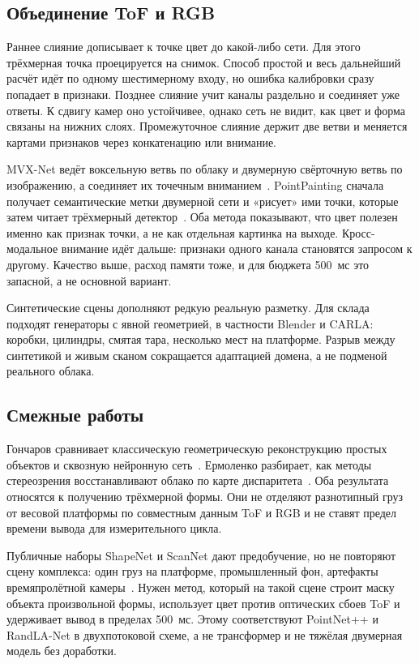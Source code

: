 \documentclass{misisarticle}
\begin{document}
\subsection{Объединение ToF и RGB}

Раннее слияние дописывает к точке цвет до какой-либо сети. Для этого трёхмерная точка проецируется на снимок. Способ простой и весь дальнейший расчёт идёт по одному шестимерному входу, но ошибка калибровки сразу попадает в признаки. Позднее слияние учит каналы раздельно и соединяет уже ответы. К сдвигу камер оно устойчивее, однако сеть не видит, как цвет и форма связаны на нижних слоях. Промежуточное слияние держит две ветви и меняется картами признаков через конкатенацию или внимание.

MVX-Net ведёт воксельную ветвь по облаку и двумерную свёрточную ветвь по изображению, а соединяет их точечным вниманием~\cite{mvxnet}. PointPainting сначала получает семантические метки двумерной сети и «рисует» ими точки, которые затем читает трёхмерный детектор~\cite{pointpainting}. Оба метода показывают, что цвет полезен именно как признак точки, а не как отдельная картинка на выходе. Кросс-модальное внимание идёт дальше: признаки одного канала становятся запросом к другому. Качество выше, расход памяти тоже, и для бюджета 500~мс это запасной, а не основной вариант.

Синтетические сцены дополняют редкую реальную разметку. Для склада подходят генераторы с явной геометрией, в частности Blender и CARLA: коробки, цилиндры, смятая тара, несколько мест на платформе. Разрыв между синтетикой и живым сканом сокращается адаптацией домена, а не подменой реального облака.

\subsection{Смежные работы}

Гончаров сравнивает классическую геометрическую реконструкцию простых объектов и сквозную нейронную сеть~\cite{goncharov}. Ермоленко разбирает, как методы стереозрения восстанавливают облако по карте диспаритета~\cite{ermolenko}. Оба результата относятся к получению трёхмерной формы. Они не отделяют разнотипный груз от весовой платформы по совместным данным ToF и RGB и не ставят предел времени вывода для измерительного цикла.

Публичные наборы ShapeNet и ScanNet дают предобучение, но не повторяют сцену комплекса: один груз на платформе, промышленный фон, артефакты времяпролётной камеры~\cite{shapenet,scannet}. Нужен метод, который на такой сцене строит маску объекта произвольной формы, использует цвет против оптических сбоев ToF и удерживает вывод в пределах 500~мс. Этому соответствуют PointNet++ и RandLA-Net в двухпотоковой схеме, а не трансформер и не тяжёлая двумерная модель без доработки.
\end{document}
